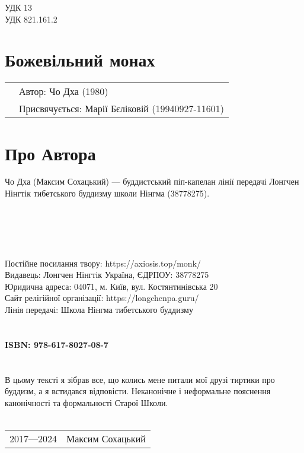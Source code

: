 \noindent УДК 13\\
\noindent УДК 821.161.2

\section*{Божевільний монах \dharmachakra}

\begin{tabular}{ll}
& Автор: Чо Дха (1980)\\
& Присвячується: Марії Бєліковій (19940927-11601)
\end{tabular}

\section*{Про Автора}
Чо Дха (Максим Сохацький) --- буддистський піп-капелан лінії передачі
Лонгчен Нінгтік тибетського буддизму школи Нінгма (38778275).
\\
\\
\\
\\
\\
\\
Постійне посилання твору: https://axiosis.top/monk/ \\
Видавець: Лонгчен Нінгтік Україна, ЄДРПОУ: 38778275 \\
Юридична адреса: 04071, м. Київ, вул. Костянтинівська 20 \\
Сайт релігійної організації: https://longchenpa.guru/ \\
Лінія передачі: Школа Нінгма тибетського буддизму \\
\\
\\
{\bf ISBN: 978-617-8027-08-7 \hspace{2em}} \\
\\
\\
\indent В цьому тексті я зібрав все, що колись мене
питали мої друзі тиртики про буддизм, а я встидався відповісти.
Неканонічне і неформальне пояснення канонічності та формальності Старої Школи.
\\
\\
\begin{tabular}{ll}
\textcopyright{} 2017---2024 & Максим Сохацький
\end{tabular}
